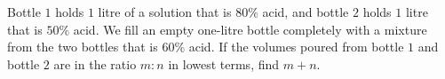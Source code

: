Bottle $1$ holds $1$ litre of a solution that is $80\%$ acid, and bottle $2$ holds $1$ litre that is $50\%$ acid. We fill an empty one-litre bottle completely with a mixture from the two bottles that is $60\%$ acid. If the volumes poured from bottle $1$ and bottle $2$ are in the ratio $m:n$ in lowest terms, find $m+n$.
